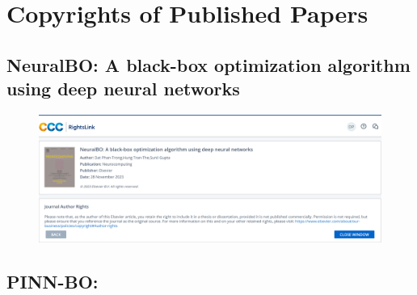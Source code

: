 \chapter*{Copyrights of Published Papers}
\section{NeuralBO: A black-box optimization algorithm using deep neural networks}
\begin{figure}[h]
    \centering
    \includegraphics[width=\textwidth]{Figures/Elsvier.png}
\end{figure}

\section{PINN-BO:}
